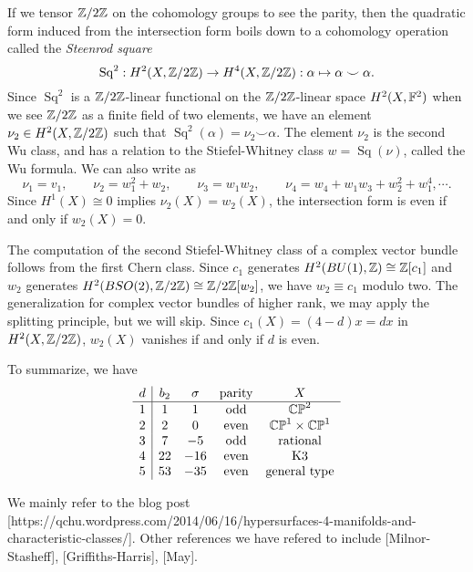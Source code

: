 \documentclass{../../../small}
\begin{document}
If we tensor $\mathbb{Z}/2\mathbb{Z}$ on the cohomology groups to see the parity, then the quadratic form induced from the intersection form boils down to a cohomology operation called the \emph{Steenrod square}
\[\operatorname{Sq}^2:H^2(X,\mathbb{Z}/2\mathbb{Z})\to H^4(X,\mathbb{Z}/2\mathbb{Z}):\alpha\mapsto\alpha\smile\alpha.\]
Since $\operatorname{Sq}^2$ is a $\mathbb{Z}/2\mathbb{Z}$-linear functional on the $\mathbb{Z}/2\mathbb{Z}$-linear space $H^2(X,\mathbb{F}^2)$ when we see $\mathbb{Z}/2\mathbb{Z}$ as a finite field of two elements, we have an element $\nu_2\in H^2(X,\mathbb{Z}/2\mathbb{Z})$ such that $\operatorname{Sq}^2(\alpha)=\nu_2\smile\alpha$.
The element $\nu_2$ is the second Wu class, and has a relation to the Stiefel-Whitney class $w=\operatorname{Sq}(\nu)$, called the Wu formula.
We can also write as
\[\nu_1=v_1,\qquad \nu_2=w_1^2+w_2,\qquad \nu_3=w_1w_2,\qquad \nu_4=w_4+w_1w_3+w_2^2+w_1^4,\cdots.\]
Since $H^1(X)\cong0$ implies $\nu_2(X)=w_2(X)$, the intersection form is even if and only if $w_2(X)=0$.

The computation of the second Stiefel-Whitney class of a complex vector bundle follows from the first Chern class.
Since $c_1$ generates $H^2(BU(1),\mathbb{Z})\cong\mathbb{Z}[c_1]$ and $w_2$ generates $H^2(BSO(2),\mathbb{Z}/2\mathbb{Z})\cong\mathbb{Z}/2\mathbb{Z}[w_2]$, we have $w_2\equiv c_1$ modulo two.
The generalization for complex vector bundles of higher rank, we may apply the splitting principle, but we will skip.
Since $c_1(X)=(4-d)x=dx$ in $H^2(X,\mathbb{Z}/2\mathbb{Z})$, $w_2(X)$ vanishes if and only if $d$ is even.


\bigskip

To summarize, we have
\[\begin{array}{c|cccc}
d&b_2&\sigma&\text{parity}&X\\\hline
1&1&1&\text{odd}&\mathbb{CP}^2\\
2&2&0&\text{even}&\mathbb{CP}^1\times\mathbb{CP}^1\\
3&7&-5&\text{odd}&\text{rational}\\
4&22&-16&\text{even}&\text{K3}\\
5&53&-35&\text{even}&\text{general type}
\end{array}\]

\bigskip

We mainly refer to the blog post [https://qchu.wordpress.com/2014/06/16/hypersurfaces-4-manifolds-and-characteristic-classes/].
Other references we have refered to include [Milnor-Stasheff], [Griffiths-Harris], [May].
\end{document}
